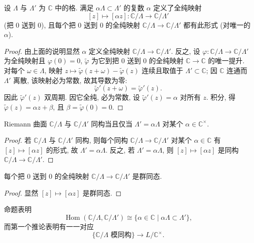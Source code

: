 \begin{proposition} \label{thm:3.3.3} 
设 $\Lambda$ 与 $\Lambda'$ 为 $\mathbb{C}$ 中的格. 满足 $\alpha\Lambda\subset\Lambda'$ 的复数 $\alpha$ 定义了全纯映射
\[
[z]\mapsto[\alpha z]\colon\mathbb{C}/\Lambda\to\mathbb{C}/\Lambda'
\]
(把 $0$ 送到 $0$), 且每个把 $0$ 送到 $0$ 的全纯映射 $\mathbb{C}/\Lambda\to\mathbb{C}/\Lambda'$ 都有此形式 (对唯一的 $\alpha$).
\end{proposition}

\begin{proof}
由上面的说明显然 $\alpha$ 定义全纯映射 $\mathbb{C}/\Lambda\to\mathbb{C}/\Lambda'$. 反之, 设 $\varphi\colon\mathbb{C}/\Lambda\to\mathbb{C}/\Lambda'$ 为全纯映射且 $\varphi(0) = 0$, $\tilde{\varphi}$ 为它到把 $0$ 送到 $0$ 的全纯映射 $\mathbb{C}\to\mathbb{C}$ 的唯一提升. 对每个 $\omega\in\Lambda$, 映射 $z\mapsto\tilde{\varphi}(z+\omega) - \tilde{\varphi}(z)$ 连续且取值于 $\Lambda'\subset\mathbb{C}$; 因 $\mathbb{C}$ 连通而 $\Lambda'$ 离散, 该映射必为常数, 故其导数为零:
\[
\tilde{\varphi}'(z+\omega) = \tilde{\varphi}'(z).
\]
因此 $\tilde{\varphi}'(z)$ 双周期. 因它全纯, 必为常数, 设 $\tilde{\varphi}'(z) = \alpha$ 对所有 $z$. 积分, 得 $\tilde{\varphi}(z) = \alpha z + \beta$, 且 $\beta = \tilde{\varphi}(0) = 0$.
\end{proof}

\begin{corollary} \label{thm:3.3.4} 
Riemann 曲面 $\mathbb{C}/\Lambda$ 与 $\mathbb{C}/\Lambda'$ 同构当且仅当 $\Lambda' = \alpha\Lambda$ 对某个 $\alpha\in\mathbb{C}^{\times}$.
\end{corollary}

\begin{proof}
若 $\mathbb{C}/\Lambda$ 与 $\mathbb{C}/\Lambda'$ 同构, 则每个同构 $\mathbb{C}/\Lambda\to\mathbb{C}/\Lambda'$ 对某个 $\alpha\in\mathbb{C}$ 有 $[z]\mapsto[\alpha z]$ 的形式, 故 $\Lambda' = \alpha\Lambda$. 反之, 若 $\Lambda' = \alpha\Lambda$, 则 $[z]\mapsto[\alpha z]$ 是同构 $\mathbb{C}/\Lambda\to\mathbb{C}/\Lambda'$.
\end{proof}

\begin{corollary} \label{thm:3.3.5} 
每个把 $0$ 送到 $0$ 的全纯映射 $\mathbb{C}/\Lambda\to\mathbb{C}/\Lambda'$ 是群同态.
\end{corollary}

\begin{proof}
显然 $[z]\mapsto[\alpha z]$ 是群同态.
\end{proof}

命题表明
\[
\operatorname{Hom}(\mathbb{C}/\Lambda, \mathbb{C}/\Lambda') \cong \{\alpha\in\mathbb{C} \mid \alpha\Lambda\subset\Lambda'\},
\]
而第一个推论表明有一一对应
\[
\{\mathbb{C}/\Lambda \text{ 模同构}\}\to L/\mathbb{C}^{\times}.
\]

